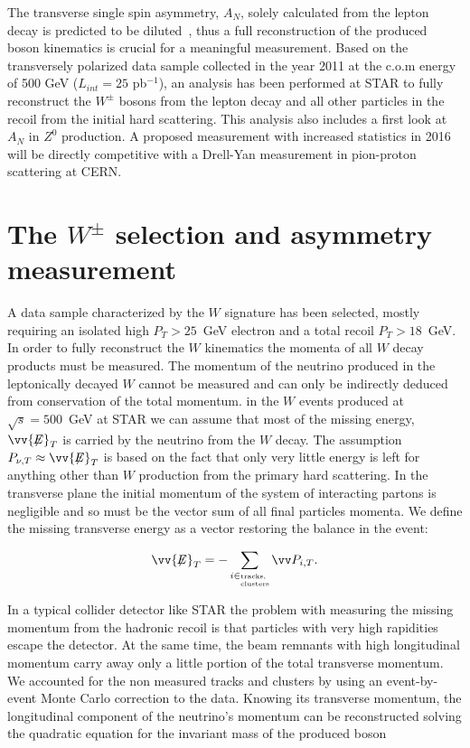 \documentclass{PoS}
\newcommand{\missET}{\vv{\not{\!\!E}}_T}
\begin{document}
The transverse single spin asymmetry, $A_N$, 
solely calculated from the lepton decay is predicted to be diluted~\cite{Kang:2009bp}, thus a full reconstruction of the produced boson kinematics is crucial for a meaningful measurement.
Based on the transversely polarized data sample collected in the year 2011 at the c.o.m energy of 500 GeV ($L_{int} = 25$ pb$^{-1}$), an analysis has been performed at STAR to fully reconstruct the $W^{\pm}$ bosons from the lepton decay and all other particles in the recoil from the initial hard scattering. This analysis also includes a first look at $A_{N}$ in $Z^{0}$ production. A proposed measurement with increased statistics in 2016 will be directly competitive with a Drell-Yan measurement in pion-proton scattering at CERN.


\section{The $W^{\pm}$ selection and asymmetry measurement}
A data sample characterized by the $W$ signature has been selected, mostly requiring an isolated high $P_{T} > 25$~GeV electron and a total recoil $P_{T} >18$~GeV.
In order to fully reconstruct the $W$ kinematics the momenta of all $W$ decay
products must be measured. The momentum of the neutrino produced in the leptonically decayed $W$
cannot be measured and can only be indirectly deduced from conservation of the total momentum. 
in the $W$ events produced at $\sqrt{s}=500$~GeV
at STAR we can assume that most of the missing energy, $\missET$ is carried by the neutrino from the
$W$ decay. The assumption ${P}_{\nu, T} \approx \missET$ is based on the
fact that only very little energy is left for anything other than $W$ production
from the primary hard scattering.
In the transverse plane the initial momentum of the system of interacting partons is negligible
and so must be the vector sum of all final particles momenta. We define the
missing transverse energy as a vector restoring the balance in the event:

\begin{equation}
\missET = - \sum_{i \in \parbox[t]{\widthof{\tiny clusters}}{\tiny tracks, clusters}} \vv P_{i,T}.
\end{equation}

In a typical collider detector like STAR the problem with measuring the missing momentum from the hadronic recoil
is that particles with very high rapidities escape the detector. At the same time, the beam remnants with high
longitudinal momentum carry away only a little portion of the total transverse
momentum. We accounted for the non measured tracks and clusters by using an event-by-event Monte Carlo 
correction to the data.
Knowing its transverse momentum, the longitudinal component of the neutrino's momentum can be reconstructed solving the quadratic equation for the invariant mass of the produced boson
\end{document}
